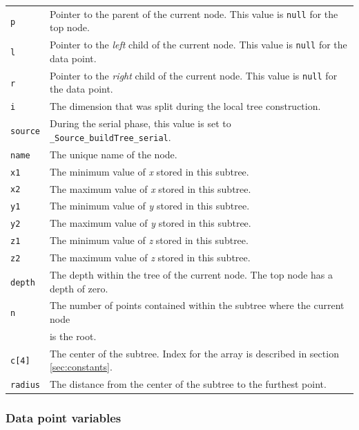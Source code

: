 \documentclass{article}
\begin{document}
\begin{tabular}{l l}
\texttt{p} & Pointer to the parent of the current node. This value is \texttt{null} for the top node. \\
\texttt{l} & Pointer to the \textit{left} child of the current node. This value is \texttt{null} for the data point. \\
\texttt{r} & Pointer to the \textit{right} child of the current node. This value is \texttt{null} for the data point. \\
\texttt{i} & The dimension that was split during the local tree construction. \\
\texttt{source} & During the serial phase, this value is set to \texttt{\_Source\_buildTree\_serial}. \\
\texttt{name} & The unique name of the node. \\
\texttt{x1} & The minimum value of \textit{x} stored in this subtree. \\
\texttt{x2} & The maximum value of \textit{x} stored in this subtree. \\
\texttt{y1} & The minimum value of \textit{y} stored in this subtree. \\
\texttt{y2} & The maximum value of \textit{y} stored in this subtree. \\
\texttt{z1} & The minimum value of \textit{z} stored in this subtree. \\
\texttt{z2} & The maximum value of \textit{z} stored in this subtree. \\
\texttt{depth} & The depth within the tree of the current node. The top node has a depth of zero. \\
\texttt{n} & The number of points contained within the subtree where the current node \\
& is the root. \\
\texttt{c[4]} & The center of the subtree. Index for the array is described in section \ref{sec:constants}. \\
\texttt{radius} & The distance from the center of the subtree to the furthest point. \\
\end{tabular}


%
%

\subsubsection{Data point variables}
\end{document}
